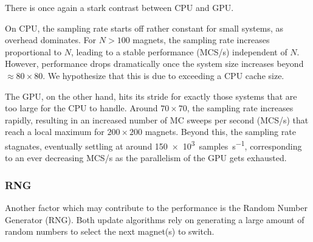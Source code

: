There is once again a stark contrast between CPU and GPU. \par
On CPU, the sampling rate starts off rather constant for small systems, as overhead dominates.
For $N>100$ magnets, the sampling rate increases proportional to $N$, leading to a stable performance (MCS/s) independent of $N$.
However, performance drops dramatically once the system size increases beyond $\approx 80 \times 80$. %
We hypothesize that this is due to exceeding a CPU cache size. \par
The GPU, on the other hand, hits its stride for exactly those systems that are too large for the CPU to handle.
Around $70 \times 70$, the sampling rate increases rapidly, resulting in an increased number of MC sweeps per second (MCS/s) that reach a local maximum for $200 \times 200$ magnets.
Beyond this, the sampling rate stagnates, eventually settling at around \SI{150e3}{samples\per\second}, corresponding to an ever decreasing MCS/s as the parallelism of the GPU gets exhausted.

\subsubsection{RNG}
Another factor which may contribute to the performance is the Random Number Generator (RNG).
Both update algorithms rely on generating a large amount of random numbers to select the next magnet(s) to switch. %

